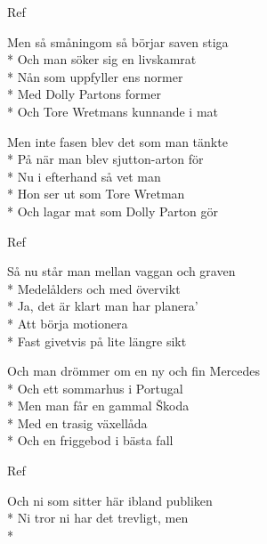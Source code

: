 \begin{SongText}[Pessemistkonsulten]
\begin{SongVerse}
    \end{SongVerse}
    \begin{SongVerse}
        Ref
    \end{SongVerse}
    \begin{SongVerse}
        Men så småningom så börjar saven stiga\\*%
        Och man söker sig en livskamrat\\*%
        Nån som uppfyller ens normer\\*%
        Med Dolly Partons former\\*%
        Och Tore Wretmans kunnande i mat
    \end{SongVerse}
    \begin{SongVerse}
        Men inte fasen blev det som man tänkte\\*%
        På när man blev sjutton-arton för\\*%
        Nu i efterhand så vet man\\*%
        Hon ser ut som Tore Wretman\\*%
        Och lagar mat som Dolly Parton gör
    \end{SongVerse}
    \begin{SongVerse}
        Ref
    \end{SongVerse}
    \begin{SongVerse}
        Så nu står man mellan vaggan och graven\\*%
        Medelålders och med övervikt\\*%
        Ja, det är klart man har planera'\\*%
        Att börja motionera\\*%
        Fast givetvis på lite längre sikt
    \end{SongVerse}
    \begin{SongVerse}
        Och man drömmer om en ny och fin Mercedes\\*%
        Och ett sommarhus i Portugal\\*%
        Men man får en gammal Škoda\\*%
        Med en trasig växellåda\\*%
        Och en friggebod i bästa fall
    \end{SongVerse}
    \begin{SongVerse}
        Ref
    \end{SongVerse}
    \begin{SongVerse}
        Och ni som sitter här ibland publiken\\*%
        Ni tror ni har det trevligt, men\\*%

\end{SongVerse}
\end{SongText}
